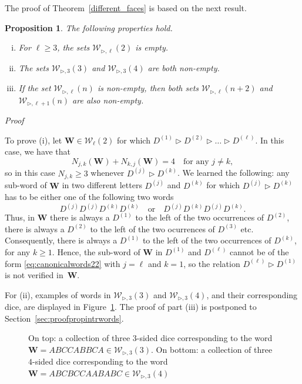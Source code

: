\documentclass[reqno,a4paper,11pt]{amsart}
\makeatletter
\newcommand{\btt}{\triangleright}
\newtheorem{proposition}[lemma]{Proposition}
\theoremstyle{remark}
\newcommand{\mc}[1]{{\mathcal #1}}
\newcommand{\mb}[1]{{\mathbf #1}}
\numberwithin{equation}{section}
\newcommand{\dado}[6]{
    \node (pol#1) [draw=black, thick, fill=blue!60!green,rotate=0, fill opacity=0.2, text opacity=1,minimum size=3cm,regular polygon, regular polygon sides=#2] at #4 {$#1$};

    \foreach \n [count=\nu from 1] in #3
        \coordinate (#1coord\nu) at (pol#1.corner \nu);
    \coordinate (#1coord0) at (pol#1.corner #2);

    \foreach \n [count=\nu from 1, count=\nuu from 0] in #3
        \node[label={[label distance=2cm]},anchor=(\nu+(#2+1)/2 #5)*(360/#2)]at($(#1coord\nuu)!0.5!(#1coord\nu)$){$\n$};

    \foreach \n [count=\nu from 1, count=\nuu from 0] in #6
        \node[ anchor=(\nu+1/2 #5)*(360/#2)]at($(#1coord\nuu)!0.5!(#1coord\nu)$){$\n$};
}
\renewenvironment{proof}[1][Proof]{\par
\pushQED{\qed}%
\normalfont \topsep6\p@\@plus6\p@\relax
\trivlist
\item\relax
{\itshape
#1\@addpunct{.}}\hspace\labelsep\ignorespaces
}{%
\popQED\endtrivlist\@endpefalse
}
\makeatother
\begin{document}
The proof of Theorem~\ref{different_faces} is based on the next result.
\begin{proposition}\label{prop:intrwords}
The following properties hold.
\begin{enumerate}[(i)]
\item For $\ell \geq 3$, the sets $\mc W_{\btt,\ell}(2)$ is empty.
\item The sets $\mc W_{\btt,3}(3)$ and $\mc W_{\btt,3}(4)$ are both non-empty.
\item If the set $\mc W_{\btt,\ell}(n)$ is non-empty, then both sets $\mc W_{\btt,\ell}(n+2)$ and $\mc W_{\btt,\ell+1}(n)$ are also non-empty.
\end{enumerate}
\end{proposition}
\begin{proof}
To prove (i), let $\mb W\in \mc W_\ell(2)$ for which $D^{(1)}\btt D^{(2)}\btt \hdots \btt D^{(\ell)}$. In this case, we have that
%
$$
N_{j,k}(\mb W)+N_{k,j}(\mb W)=4\quad \text{for any } j\neq k,
$$
%
so in this case $N_{j,k}\geq 3$ whenever $D^{(j)}\btt D^{(k)}$. We learned the following: any sub-word of $\mb W$ in two different letters $D^{(j)}$ and $D^{(k)}$ for which $D^{(j)}\btt D^{(k)}$ has to be either one of the following two words
%
\begin{equation}\label{eq:canonicalwords22}
D^{(j)} D^{(j)} D^{(k)} D^{(k)} \quad \text{or}\quad D^{(j)} D^{(k)} D^{(j)} D^{(k)}.
\end{equation}
%
Thus, in $\mb W$ there is always a $D^{(1)}$ to the left of the two occurrences of $D^{(2)}$, there is always a $D^{(2)}$ to the left of the two ocurrences of $D^{(3)}$ etc. Consequently, there is always a $D^{(1)}$ to the left of the two occurrences of $D^{(k)}$, for any $k\geq 1$. Hence, the sub-word of $\mb W$ in $D^{(1)}$ and $D^{(\ell)}$ cannot be of the form \eqref{eq:canonicalwords22} with $j=\ell$ and $k=1$, so the relation $D^{(\ell)}\btt D^{(1)}$ is not verified in~$\mb W$.

For (ii), examples of words in $\mc W_{\btt,3}(3)$ and $\mc W_{\btt,3}(4)$, and their corresponding dice, are displayed in Figure~\ref{fig:33intrdice}. The proof of part (iii) is postponed to Section~\ref{sec:proofpropintrwords}.
\end{proof}
\begin{figure}[!htb]
\centering
{}
\caption{On top: a collection of three $3$-sided dice corresponding to the word $\mb W=ABCCABBCA\in\mc W_{\btt,3}(3)$. On bottom: a collection of three $4$-sided dice corresponding to the word $\mb W=ABCBCCAABABC\in\mc W_{\btt,3}(4)$}\label{fig:33intrdice}
\end{figure}
\end{document}
